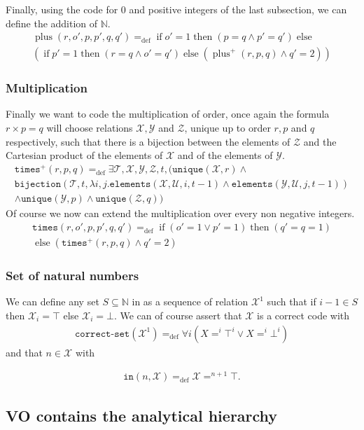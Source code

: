 \documentclass[a4paper,12pt]{article}
\newcommand{\sss}[1]{\subsubsection{#1}}
\theoremstyle{definition}
\DeclareMathOperator{\plu}{plus}
\DeclareMathOperator{\ifte}{if}
\DeclareMathOperator{\thent}{then}
\DeclareMathOperator{\elset}{else}
\newcommand{\mc}{\mathcal}
\newcommand{\ed}{=_{\mathrm{def}}}
\begin{document}
Finally, using the code for 0 and positive integers of the last
subsection, we can define the addition of $\mathbb N$.
\begin{eqnarray}\plu(r,o',p,p',q,q')\ed \ifte o'=1 \thent(p=q\land p'=q')\elset\nonumber\\
  (\ifte p'=1\thent (r=q\land o'=q')\elset(\plu^+(r,p,q)\land q'=2))
\end{eqnarray}
\sss{Multiplication}
Finally we want to code the multiplication of order, once again the
formula $r\times p=q$ will choose relations $\mc {X,Y}$ and $\mc Z$,
unique up to order $r,p$ and $q$ respectively, such that there is a
bijection between the elements of $\mc Z$ and the Cartesian product of
the elements of $\mc X$ and of the elements of $\mc Y$.
\begin{eqnarray}
  \label{eq:time+}
  \texttt{times}^+(r,p,q)\ed\exists \mc{T,X,Y,Z},t,(\texttt{unique}(\mc X,r)\land\nonumber\\
  \texttt{bijection}(\mc T,t,\lambda i,j.\texttt{elements}(\mc X,\mc U,i,t-1)\land\texttt{elements}(\mc Y,\mc U,j,t-1))\nonumber\\
  \land\texttt{unique}(\mc Y,p)\land\texttt{unique}(\mc Z,q))
\end{eqnarray}
Of course we now can extend the multiplication over every non negative
integers.
\begin{eqnarray}\label{eq:times+}\texttt{times}(r,o',p,p',q,q')\ed \ifte (o'=1\lor p'=1) \thent(q'=q=1)\nonumber\\
  \elset(\texttt{times}^+(r,p,q)\land q'=2)
\end{eqnarray}

\sss{Set of natural numbers}
We can define any set $S\subseteq \mathbb N$ in \VO{} as a sequence of
relation $\mc X^{1}$ such that if $i-1\in S$ then $\mc X_{i}=\top$ else
$\mc X_{i}=\bot$. We can of course assert that $\mc X$ is a correct
code with
\begin{eqnarray*}
  \texttt{correct-set}(\mc X^{1})\ed\forall i( X=^{i}\top^{i} \lor
  X=^{i}\bot^{i})
\end{eqnarray*}
and that $n\in \mc X$ with 

\begin{eqnarray*}
  \texttt{in}(n,\mc X)\ed \mc X=^{n+1}\top.
\end{eqnarray*}

\subsection{VO contains the analytical hierarchy}
\end{document}
